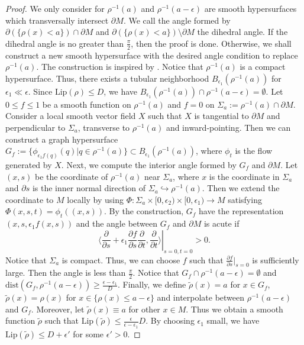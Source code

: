 \documentclass[11pt,letterpaper]{amsart}
\theoremstyle{definition}
\theoremstyle{remark}
\numberwithin{equation}{section}
\begin{document}
\begin{proof}
    We only consider for $\rho^{-1}(a)$ and $\rho^{-1}(a-\epsilon)$ are smooth hypersurfaces which transversally intersect $\partial M$. We call the angle formed by $\partial(\{\rho(x)<a\})\cap\partial M$ and $\partial(\{\rho(x)<a\})\setminus \partial M$ the dihedral angle. If the dihedral angle is no greater than $\frac{\pi}{2}$, then the proof is done. Otherwise, we shall construct a new smooth hypersurface with the desired angle condition to replace $\rho^{-1}(a)$. The construction is inspired by \cite{chen2024positivescalarcurvaturemetrics}. Notice that $\rho^{-1}(a)$ is a compact hypersurface. Thus, there exists a tubular neighborhood  $B_{\epsilon_{1}}(\rho^{-1}(a))$ for $\epsilon_{1}\ll\epsilon$. Since $\text{Lip}(\rho)\leq D$, we have $B_{\epsilon_{1}}(\rho^{-1}(a))\cap \rho^{-1}(a-\epsilon)=\emptyset$. Let $0\leq f\leq 1$ be a smooth function on $\rho^{-1}(a)$ and $f=0$ on $\Sigma_{a}:=\rho^{-1}(a)\cap \partial M$. Consider a local smooth vector field $X$ such that $X$ is tangential to $\partial M$ and perpendicular to $\Sigma_{a}$, transverse to $\rho^{-1}(a)$ and inward-pointing. Then we can construct a graph hypersurface $G_{f}:=\{\phi_{\epsilon_{1}f(q)}(q)|q\in \rho^{-1}(a)\}\subset B_{\epsilon_{1}}(\rho^{-1}(a))$, where $\phi_{t}$ is the flow generated by $X$. 
    Next, we compute the interior angle formed by $G_{f}$ and $\partial M$. Let $(x,s)$ be the coordinate of $\rho^{-1}(a)$ near $\Sigma_{a}$, where $x$ is the coordinate in $\Sigma_{a}$ and $\partial s$ is the inner normal direction of $\Sigma_{a}\hookrightarrow \rho^{-1}(a)$. Then we extend the coordinate to $M$ locally by using $\Phi: \Sigma_{a}\times [0,\epsilon_{2})\times [0,\epsilon_{1})\rightarrow M$ satisfying $\Phi(x,s,t)=\phi_{t}((x,s))$. By the construction, $G_{f}$ have the representation $(x,s,\epsilon_{1}f(x,s))$ and the angle between $G_{f}$ and $\partial M$ is acute if  $$\left.\langle \frac{\partial }{\partial s}+\epsilon_{1} \frac{\partial f}{\partial s} \frac{\partial}{\partial t},\frac{\partial}{\partial t}\rangle\right|_{s=0,t=0}>0.$$
    Notice that $\Sigma_{a}$ is compact. Thus, we can choose $f$ such that $\frac{\partial f}{\partial s}|_{s=0}$ is sufficiently large. Then the angle is less than $\frac{\pi}{2}$.
   Notice that $G_{f}\cap \rho^{-1}(a-\epsilon)=\emptyset$ and $\text{dist}(G_{f},\rho^{-1}(a-\epsilon))\geq \frac{\epsilon-\epsilon_{1}}{D}$. Finally, we define $\tilde{\rho}(x)=a$ for $x\in G_{f}$, $\tilde{\rho}(x)=\rho(x)$ for $x\in \{\rho(x)\leq a-\epsilon\}$ and interpolate between $\rho^{-1}(a-\epsilon)$ and $G_{f}$. Moreover, let $\tilde{\rho}(x)\equiv a$ for other $x\in M.$ Thus we obtain a smooth function $\tilde{\rho}$ such that $\text{Lip}(\tilde{\rho})\leq \frac{\epsilon}{\epsilon-\epsilon_{1}}D$. By choosing $\epsilon_1$ small, we have $ \text{Lip}(\tilde{\rho})\leq D+\epsilon'$ for some $\epsilon'>0$.
\end{proof}
\end{document}
